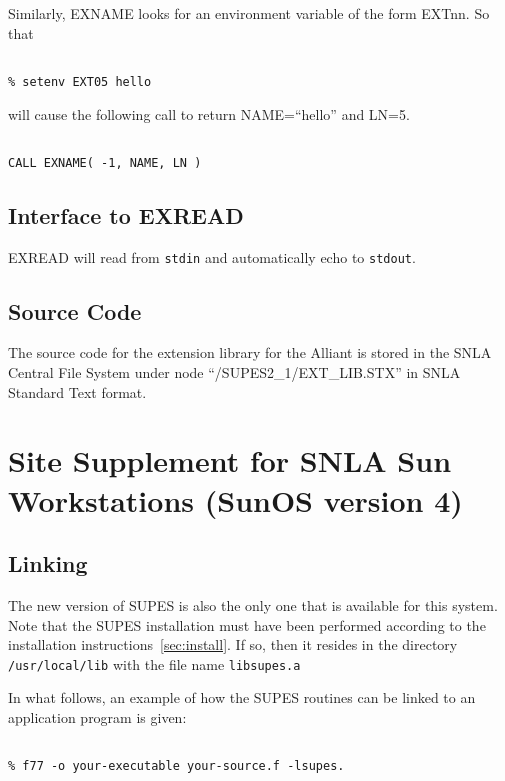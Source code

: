 Similarly,
EXNAME looks for an environment variable of the form
EXTnn.
So that
\begin{verbatim}

% setenv EXT05 hello

\end{verbatim}
will cause the following call to return NAME=``hello'' and LN=5.
\begin{verbatim}

CALL EXNAME( -1, NAME, LN )
\end{verbatim}

\subsection{Interface to EXREAD}
EXREAD will read from \verb+stdin+ and automatically echo to \verb+stdout+.

\subsection{Source Code}
The source code for the extension library for the Alliant
is stored in the SNLA Central File System under node
``/SUPES2\_1/EXT\_LIB.STX''
in SNLA Standard Text format.

\cleardoublepage
\section{Site Supplement for SNLA Sun Workstations (SunOS version 4)}

\subsection{Linking}
The new version of SUPES is also the only one that is available for this system.
Note that the SUPES installation must have been performed according to 
the installation instructions~\ref{sec:install}.
If so,
then it resides in the directory \verb+/usr/local/lib+
with the file name \verb+libsupes.a+

In what follows,
an example of how the SUPES routines can be linked to an application program
is given:
\begin{verbatim}

% f77 -o your-executable your-source.f -lsupes.
\end{verbatim}

